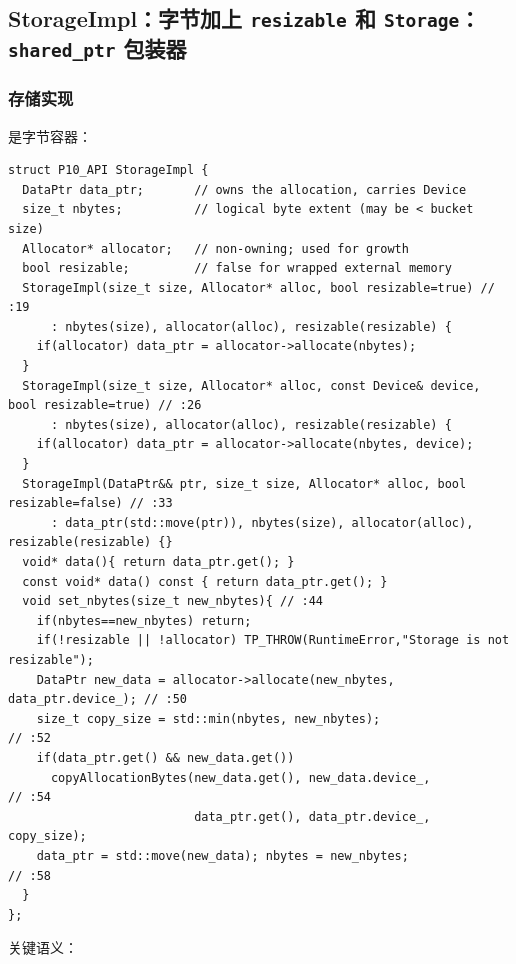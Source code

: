 \subsection{StorageImpl：字节加上 \texttt{resizable} 和 \texttt{Storage}：\texttt{shared\_ptr} 包装器}
\label{sec:storage}

\subsubsection{存储实现}

是字节容器：

\begin{lstlisting}[caption={bytes, allocator, resizable.}, label=lst:storageimplfull]
struct P10_API StorageImpl {
  DataPtr data_ptr;       // owns the allocation, carries Device
  size_t nbytes;          // logical byte extent (may be < bucket size)
  Allocator* allocator;   // non-owning; used for growth
  bool resizable;         // false for wrapped external memory
  StorageImpl(size_t size, Allocator* alloc, bool resizable=true) // :19
      : nbytes(size), allocator(alloc), resizable(resizable) {
    if(allocator) data_ptr = allocator->allocate(nbytes);
  }
  StorageImpl(size_t size, Allocator* alloc, const Device& device, bool resizable=true) // :26
      : nbytes(size), allocator(alloc), resizable(resizable) {
    if(allocator) data_ptr = allocator->allocate(nbytes, device);
  }
  StorageImpl(DataPtr&& ptr, size_t size, Allocator* alloc, bool resizable=false) // :33
      : data_ptr(std::move(ptr)), nbytes(size), allocator(alloc), resizable(resizable) {}
  void* data(){ return data_ptr.get(); }
  const void* data() const { return data_ptr.get(); }
  void set_nbytes(size_t new_nbytes){ // :44
    if(nbytes==new_nbytes) return;
    if(!resizable || !allocator) TP_THROW(RuntimeError,"Storage is not resizable");
    DataPtr new_data = allocator->allocate(new_nbytes, data_ptr.device_); // :50
    size_t copy_size = std::min(nbytes, new_nbytes);                        // :52
    if(data_ptr.get() && new_data.get())
      copyAllocationBytes(new_data.get(), new_data.device_,                 // :54
                          data_ptr.get(), data_ptr.device_, copy_size);
    data_ptr = std::move(new_data); nbytes = new_nbytes;                    // :58
  }
};
\end{lstlisting}

关键语义：


